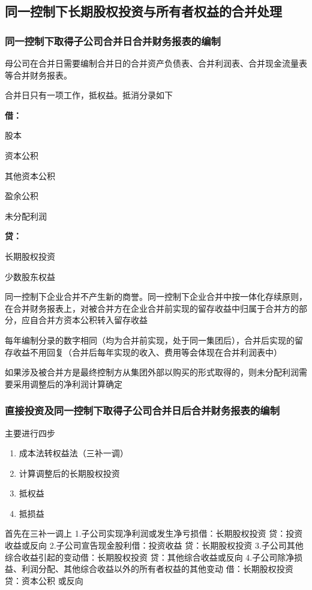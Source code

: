\documentclass[UTF8,12pt]{ctexart}
\newenvironment{Dr}{%
	\begin{list}{}%
		{
			\setlength{\leftmargin}{2em}
			\setlength{\labelwidth}{2em}
			\setlength{\labelsep}{0pt}
			\setlength{\itemindent}{0pt}
			\setlength{\listparindent}{0pt}
			\setlength{\parsep}{0pt}
			\setlength{\topsep}{0pt}
		}
		\item[\textbf{借：}]
	}{%
	\end{list}
}
\newenvironment{Cr}{%
	\begin{list}{}%
		{
			\setlength{\leftmargin}{2em}
			\setlength{\labelwidth}{2em}
			\setlength{\labelsep}{0pt}
			\setlength{\itemindent}{0pt}
			\setlength{\listparindent}{0pt}
			\setlength{\parsep}{0pt}
			\setlength{\topsep}{0pt}
		}
		\item[\textbf{贷：}]
	}{%
	\end{list}
}
\numberwithin{equation}{section} %
\numberwithin{figure}{section}
\numberwithin{table}{section}
\begin{document}
	\subsection{同一控制下长期股权投资与所有者权益的合并处理}
	\subsubsection{同一控制下取得子公司合并日合并财务报表的编制}
	母公司在合并日需要编制合并日的合并资产负债表、合并利润表、合并现金流量表等合并财务报表。
	
	合并日只有一项工作，抵权益。抵消分录如下
	\begin{Dr}
		股本
		
		资本公积
		
		其他资本公积
		
		盈余公积
		
		未分配利润
	\end{Dr}
	\begin{Cr}
		长期股权投资
		
		少数股东权益
	\end{Cr}
	
	同一控制下企业合并不产生新的商誉。同一控制下企业合并中按一体化存续原则，在合并财务报表上，对被合并方在企业合并前实现的留存收益中归属于合并方的部分，应自合并方资本公积转入留存收益
	
	每年编制分录的数字相同（均为合并前实现，处于同一集团后），合并后实现的留存收益不用回复（合并后每年实现的收入、费用等会体现在合并利润表中）
	
	如果涉及被合并方是最终控制方从集团外部以购买的形式取得的，则未分配利润需要采用调整后的净利润计算确定
	\subsubsection{直接投资及同一控制下取得子公司合并日后合并财务报表的编制}
	主要进行四步
	\begin{enumerate}
		\item 成本法转权益法（三补一调）
		
		\item 计算调整后的长期股权投资
		
		\item 抵权益
		
		\item 抵损益
	\end{enumerate}
	首先在三补一调上
	1.子公司实现净利润或发生净亏损借：长期股权投资
	贷：投资收益或反向
	2.子公司宣告现金股利借：投资收益
	贷：长期股权投资
	3.子公司其他综合收益引起的变动借：长期股权投资
	贷：其他综合收益或反向
	4.子公司除净损益、利润分配、其他综合收益以外的所有者权益的其他变动
	借：长期股权投资贷：资本公积
	或反向
	
\end{document}
